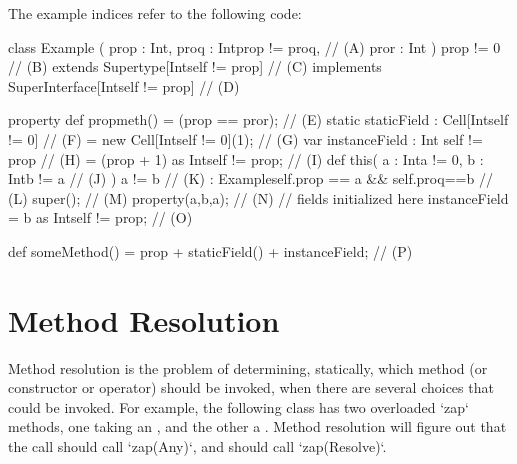 The example indices refer to the following code:
\begin{xten}
class Example (
   prop : Int,
   proq : Int{prop != proq},                    // (A)
   pror : Int
   )
   {prop != 0}                                  // (B)
   extends Supertype[Int{self != prop}]         // (C)
   implements SuperInterface[Int{self != prop}] // (D)
{
   property def propmeth() = (prop == pror);    // (E)
   static staticField
      : Cell[Int{self != 0}]                    // (F)
      = new Cell[Int{self != 0}](1);            // (G)
   var instanceField
      : Int {self != prop}                      // (H)
      = (prop + 1) as Int{self != prop};        // (I)
   def this(
      a : Int{a != 0},
      b : Int{b != a}                           // (J)
      )
      {a != b}                                  // (K)
      : Example{self.prop == a && self.proq==b} // (L)
   {
      super();                                  // (M)
      property(a,b,a);                          // (N)
      // fields initialized here
      instanceField = b as Int{self != prop};   // (O)
   }

   def someMethod() =
        prop + staticField() + instanceField;   // (P)
}
\end{xten}
%

\section{Method Resolution}
\label{sect:MethodResolution}

Method resolution is the problem of determining, statically, which method (or
constructor or operator)
should be invoked, when there are several choices that could be invoked.  For
example, the following class has two overloaded \xcd`zap` methods, one taking
an , and the other a .  Method resolution will figure
out that the call  should call \xcd`zap(Any)`, and
 should call \xcd`zap(Resolve)`.  

